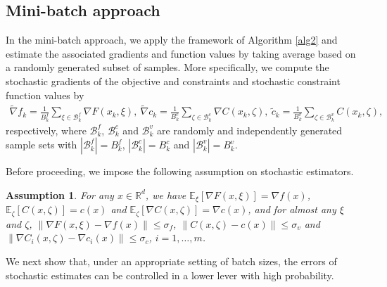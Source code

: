 \documentclass[11pt]{article}
\newtheorem{assumption}{Assumption}
\newcommand{\R}{\mathbb{R}}
\newcommand{\E}{\mathbb{E}}
\begin{document}
\subsection{Mini-batch approach}\label{ssec:mb}

In the mini-batch approach, we apply the framework of Algorithm \ref{alg2} and  estimate  the associated  gradients and function values by taking average based on a randomly generated subset of samples.  More specifically,  we compute the stochastic gradients of the objective and constraints and stochastic constraint function values by 
\begin{align}\label{minibatch}
    \tilde \nabla f_k =  \frac{1}{B_k^f} \sum_{\xi \in \mathcal B_k^f} \nabla F(x_k,\xi), ~
    \tilde \nabla c_k = \frac{1}{B_k^c} \sum_{\zeta\in \mathcal B_k^c} \nabla C(x_k,\zeta),~
    \tilde c_k = \frac{1}{B_k^v} \sum_{\zeta \in \mathcal B_k^v} C(x_k,\zeta) , 
\end{align}
respectively, where $\mathcal B_k^f$, $\mathcal B_k^c$ and $\mathcal B_k^v$ are randomly and independently generated sample  sets with $|\mathcal B_k^f| = B_k^f$, $|\mathcal B_k^c| = B_k^c$ and $|\mathcal B_k^v| = B_k^v$. 

Before proceeding, we impose the following assumption on stochastic estimators.
\begin{assumption}\label{ass:stochastic}
{For any $x \in \R^d$, we have $\E_\xi[\nabla F(x,\xi)] = \nabla f(x)$, $\E_\zeta[C(x,\zeta)] = c(x)$ and $\E_\zeta[\nabla C(x,\zeta)] = \nabla c(x)$, and for almost {any} $\xi$ and $\zeta$, \(\|\nabla F(x,\xi) - \nabla f(x)\| \leq \sigma_f\), \(\|C(x,\zeta) - c(x)\| \leq \sigma_v\) and \(\|\nabla C_i(x,\zeta) - \nabla c_i(x)\| \leq \sigma_c\), $i=1,\ldots,m$.} 
\end{assumption}

We next show that, under an appropriate setting of batch sizes, the errors of stochastic estimates can be controlled in a lower lever with high probability. 
\end{document}
